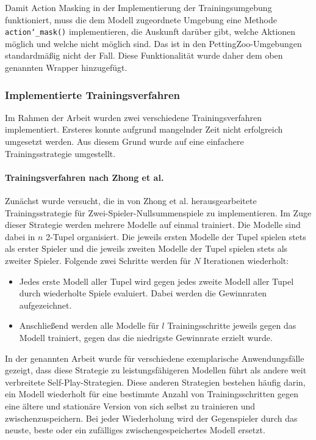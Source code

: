 \endgroup

Damit Action Masking in der Implementierung der Trainingsumgebung funktioniert, muss die dem Modell zugeordnete Umgebung eine Methode \texttt{action\char`_mask()} implementieren, die Auskunft darüber gibt, welche Aktionen möglich und welche nicht möglich sind. Das ist in den PettingZoo-Umgebungen standardmäßig nicht der Fall. Diese Funktionalität wurde daher dem oben genannten Wrapper hinzugefügt.

\subsubsection{Implementierte Trainingsverfahren}

Im Rahmen der Arbeit wurden zwei verschiedene Trainingsverfahren implementiert. Ersteres konnte aufgrund mangelnder Zeit nicht erfolgreich umgesetzt werden. Aus diesem Grund wurde auf eine einfachere Trainingsstrategie umgestellt.

\paragraph{Trainingsverfahren nach Zhong et al.}

Zunächst wurde versucht, die in \cite{Zhong.2020} von Zhong et al. herausgearbeitete Trainingsstrategie für Zwei-Spieler-Nullsummenspiele zu implementieren. Im Zuge dieser Strategie werden mehrere Modelle auf einmal trainiert. Die Modelle sind dabei in $n$ 2-Tupel organisiert. Die jeweils ersten Modelle der Tupel spielen stets als erster Spieler und die jeweils zweiten Modelle der Tupel spielen stets als zweiter Spieler. Folgende zwei Schritte werden für $N$ Iterationen wiederholt:

\begin{itemize}
	\item Jedes erste Modell aller Tupel wird gegen jedes zweite Modell aller Tupel durch wiederholte Spiele evaluiert. Dabei werden die Gewinnraten aufgezeichnet.
	\item Anschließend werden alle Modelle für $l$ Trainingsschritte jeweils gegen das Modell trainiert, gegen das die niedrigste Gewinnrate erzielt wurde.
\end{itemize}

In der genannten Arbeit wurde für verschiedene exemplarische Anwendungsfälle gezeigt, dass diese Strategie zu leistungsfähigeren Modellen führt als andere weit verbreitete Self-Play-Strategien. Diese anderen Strategien bestehen häufig darin, ein Modell wiederholt für eine bestimmte Anzahl von Trainingsschritten gegen eine ältere und stationäre Version von sich selbst zu trainieren und zwischenzuspeichern. Bei jeder Wiederholung wird der Gegenspieler durch das neuste, beste oder ein zufälliges zwischengespeichertes Modell ersetzt.

